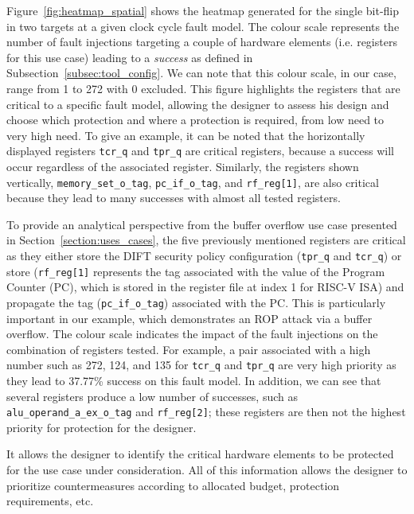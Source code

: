 Figure~\ref{fig:heatmap_spatial} shows the heatmap generated for the single bit-flip in two targets at a given clock cycle fault model.
The colour scale represents the number of fault injections targeting a couple of hardware elements (i.e. registers for this use case) leading to a \textit{success} as defined in Subsection~\ref{subsec:tool_config}. We can note that this colour scale, in our case, range from 1 to 272 with 0 excluded.
This figure highlights the registers that are critical to a specific fault model, allowing the designer to assess his design and choose which protection and where a protection is required, from low need to very high need.
To give an example, it can be noted that the horizontally displayed registers \texttt{tcr\_q} and \texttt{tpr\_q} are critical registers, because a success will occur regardless of the associated register. Similarly, the registers shown vertically, \texttt{memory\_set\_o\_tag}, \texttt{pc\_if\_o\_tag}, and \texttt{rf\_reg[1]}, are also critical because they lead to many successes with almost all tested registers.

To provide an analytical perspective from the buffer overflow use case presented in Section~\ref{section:uses_cases}, the five previously mentioned registers are critical as they either store the DIFT security policy configuration (\texttt{tpr\_q} and \texttt{tcr\_q}) or store (\texttt{rf\_reg[1]} represents the tag associated with the value of the Program Counter (PC), which is stored in the register file at index 1 for RISC-V ISA) and propagate the tag (\texttt{pc\_if\_o\_tag}) associated with the PC. This is particularly important in our example, which demonstrates an ROP attack via a buffer overflow.
The colour scale indicates the impact of the fault injections on the combination of registers tested. For example, a pair associated with a high number such as 272, 124, and 135 for \texttt{tcr\_q} and \texttt{tpr\_q} are very high priority as they lead to 37.77\% success on this fault model.
In addition, we can see that several registers produce a low number of successes, such as \mbox{\texttt{alu\_operand\_a\_ex\_o\_tag}} and \mbox{\texttt{rf\_reg[2]}}; these registers are then not the highest priority for protection for the designer.

It allows the designer to identify the critical hardware elements to be protected for the use case under consideration.
All of this information allows the designer to prioritize countermeasures according to allocated budget, protection requirements, etc.

